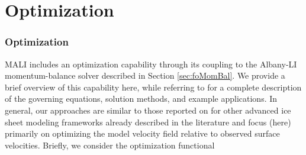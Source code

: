 \chapter{Optimization}
\label{chap:landice-optim}



\subsection{Optimization}
\label{sec:optimInit}
MALI includes an optimization capability through its coupling to the Albany-LI momentum-balance solver described in Section \ref{sec:foMomBal}. We provide a brief overview of this capability here, while referring to \cite{perego2014} for a complete description of the governing equations, solution methods, and example applications. In general, our approaches are similar to those reported on for other advanced ice sheet modeling frameworks already described in the literature \citep[e.g.,][]{Goldberg2011b,Larour2012,gagliardini2013,brinkerhoff2013,Cornford2013} and focus (here) primarily on optimizing the model velocity field relative to observed surface velocities. Briefly, we consider the optimization functional 

